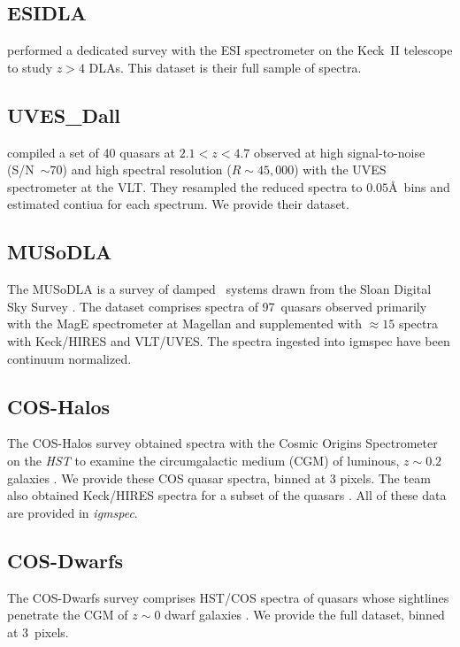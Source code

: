 \documentclass[12pt]{elsarticle}
\begin{document}
\subsection{ESIDLA}
\label{sec:esidla}

\cite{rafelski+12,rafelski+14} performed a dedicated survey
with the ESI spectrometer \citep{sbe+02} on the Keck~II telescope
to study $z>4$ DLAs.  This dataset is their
full sample of spectra.

\subsection{UVES\_Dall}
\cite{dallaglio+08} compiled a set of 40 quasars at $2.1 < z < 4.7$ observed
at high signal-to-noise (S/N~$\sim 70$) and high spectral resolution ($R\sim 45,000$)
with the UVES spectrometer \citep{uves} at the VLT.  They resampled the reduced spectra to
$0.05$\AA\ bins and estimated contiua for each spectrum.  We provide their dataset.

\subsection{MUSoDLA}

The MUSoDLA is a survey of damped \lya\ systems drawn from the
Sloan Digital Sky Survey \citep{musodla1}.   The dataset
comprises spectra of 97~quasars observed primarily with the
MagE spectrometer at Magellan and supplemented with $\approx 15$ spectra
with Keck/HIRES and VLT/UVES.
The spectra ingested into igmspec have been continuum normalized.

\subsection{COS-Halos}
\label{sec:cos-halos}

The COS-Halos survey obtained spectra with the
Cosmic Origins Spectrometer 
\citep[COS;][]{cos} on the {\it HST}
to examine the circumgalactic medium (CGM) of luminous,
$z \sim 0.2$ galaxies \citep{tumlinson+13}.
We provide these COS quasar spectra, binned at 3 pixels.
The team also obtained Keck/HIRES spectra for a subset of the
quasars \citep{werk+13}.
All of these data are provided in {\it igmspec}.

\subsection{COS-Dwarfs}
\label{sec:cos-dwarfs}

The COS-Dwarfs survey comprises HST/COS spectra
of quasars whose sightlines penetrate the CGM of
$z \sim 0$ dwarf galaxies \citep{bordoloi14}.
We provide the full dataset, binned at 3~pixels.
\end{document}
